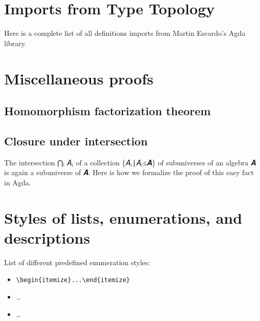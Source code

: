 \documentclass[a4paper,USenglish,cleveref,autoref,thm-restate]{lipics-v2019}
\begin{document}






\appendix

\section{Imports from Type Topology}\label{sec:imports-from-type-topology}
Here is a complete list of all definitions \agdaualib imports from Martin Escardo's \typetopology Agda library.
\begin{code}  \end{code}

\section{Miscellaneous proofs}\label{sec:appendix-miscproofs}
\subsection{Homomorphism factorization theorem}\label{sec:appendix-homfactor}
\begin{code}\end{code}
\subsection{Closure under intersection}\label{sec:closure-under-intersection}
The intersection ⋂ᵢ \AB 𝐴\(_i\) of a collection \{\AB 𝐴\(_i\)\AS ∣\AS\AB 𝐴\(_i\)\AS\ASy ≤\AS\AB 𝑨\}
of subuniverses of an algebra \AB 𝑨 is again a subuniverse of \AB 𝑨. Here is how we formalize the proof of this easy fact in Agda.
\begin{code}\end{code}

\section{Styles of lists, enumerations, and descriptions}\label{sec:itemStyles}
List of different predefined enumeration styles:

\begin{itemize}
\item \verb|\begin{itemize}...\end{itemize}|
\item \dots
\item \dots
\end{itemize}
\end{document}
